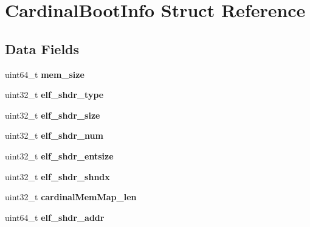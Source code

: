 \hypertarget{structCardinalBootInfo}{}\section{Cardinal\+Boot\+Info Struct Reference}
\label{structCardinalBootInfo}
\subsection*{Data Fields}
\begin{DoxyCompactItemize}
\item 
uint64\+\_\+t {\bfseries mem\+\_\+size}\hypertarget{structCardinalBootInfo_a7e8cfe4fae30d22b2c14b99cbf3b5d42}{}\label{structCardinalBootInfo_a7e8cfe4fae30d22b2c14b99cbf3b5d42}

\item 
uint32\+\_\+t {\bfseries elf\+\_\+shdr\+\_\+type}\hypertarget{structCardinalBootInfo_a031c087859cc2c556184f5b325d13882}{}\label{structCardinalBootInfo_a031c087859cc2c556184f5b325d13882}

\item 
uint32\+\_\+t {\bfseries elf\+\_\+shdr\+\_\+size}\hypertarget{structCardinalBootInfo_a1ce856f62b53fcde829f0f02889b8753}{}\label{structCardinalBootInfo_a1ce856f62b53fcde829f0f02889b8753}

\item 
uint32\+\_\+t {\bfseries elf\+\_\+shdr\+\_\+num}\hypertarget{structCardinalBootInfo_a7f1dbeaaa38638a0b033d23979ae7c04}{}\label{structCardinalBootInfo_a7f1dbeaaa38638a0b033d23979ae7c04}

\item 
uint32\+\_\+t {\bfseries elf\+\_\+shdr\+\_\+entsize}\hypertarget{structCardinalBootInfo_a699217e9222d20961a35f620bfb4c469}{}\label{structCardinalBootInfo_a699217e9222d20961a35f620bfb4c469}

\item 
uint32\+\_\+t {\bfseries elf\+\_\+shdr\+\_\+shndx}\hypertarget{structCardinalBootInfo_a4a9b12521547fd9ab1fd769e67629b4f}{}\label{structCardinalBootInfo_a4a9b12521547fd9ab1fd769e67629b4f}

\item 
uint32\+\_\+t {\bfseries cardinal\+Mem\+Map\+\_\+len}\hypertarget{structCardinalBootInfo_ad97d962186cd30c392be573d6014f425}{}\label{structCardinalBootInfo_ad97d962186cd30c392be573d6014f425}

\item 
uint64\+\_\+t {\bfseries elf\+\_\+shdr\+\_\+addr}\hypertarget{structCardinalBootInfo_af6394aaa911bb9ba9f4b7d331a7e9a65}{}\label{structCardinalBootInfo_af6394aaa911bb9ba9f4b7d331a7e9a65}


\end{DoxyCompactItemize}
